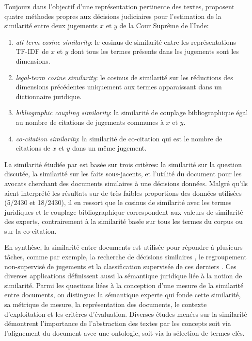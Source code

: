 Toujours dans l'objectif d'une représentation pertinente des textes, \citet{kumar2011judgmentsimilarity} proposent quatre méthodes propres aux décisions judiciaires pour l'estimation de la similarité entre deux jugements  $x$ et $y$ de la Cour Suprême de l'Inde:
\begin{enumerate}
\item \textit{all-term cosine similarity}: le cosinus de similarité entre les représentations TF-IDF de $x$ et $y$ dont tous les termes présents dans les jugements sont les dimensions.
\item \textit{legal-term cosine similarity}: le cosinus de similarité sur les réductions des dimensions précédentes uniquement aux termes apparaissant dans un dictionnaire juridique.
\item  \textit{bibliographic coupling similarity}: la similarité de couplage bibliographique égal au nombre de citations de jugements communes à $x$ et $y$.
\item \textit{co-citation similarity}: la similarité de co-citation qui est le nombre de citations de $x$ et $y$ dans un même jugement. 
\end{enumerate}

 La similarité étudiée par \citet{kumar2011judgmentsimilarity} est basée sur trois critères: la similarité sur la question discutée, la similarité sur les faits sous-jacents, et l'utilité du document pour les avocats cherchant des documents similaires à une décisions données. Malgré qu'ils aient interprété les résultats sur de très faibles proportions des données utilisées (5/2430 et 18/2430), il en ressort que le cosinus de similarité avec les termes juridiques et le couplage bibliographique correspondent aux valeurs de similarité des experts, contrairement à la similarité basée sur tous les termes du corpus ou sur la co-citation. 

En synthèse, la similarité entre documents est utilisée pour répondre à plusieurs tâches, comme par exemple, la recherche de décisions similaires \citep{thenmozhi2017legalprecedretriev}, le regroupement non-supervisé de jugements \citep{raghuveer2012legalclusteringLDA} et la classification supervisée de ces derniers \citep{ma2018wmdchinesecase}. Ces diverses applications définissent aussi la sémantique juridique liée à la notion de similarité. Parmi les questions liées à la conception d'une mesure de la similarité entre documents, on distingue: la sémantique experte qui fonde cette similarité, sa métrique de mesure, la représentation des documents, le contexte d'exploitation et les critères d'évaluation. Diverses études menées sur la similarité démontrent l'importance de l'abstraction des textes par les concepts soit via l'alignement du document avec une ontologie, soit via la sélection de termes clés.

